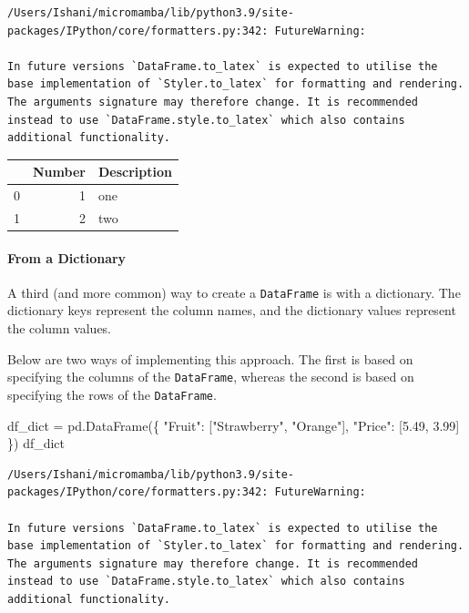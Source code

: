 \documentclass[
  letterpaper,
  DIV=11,
  numbers=noendperiod]{scrreprt}
\let\oldparagraph\paragraph
\renewcommand{\paragraph}[1]{\oldparagraph{#1}\mbox{}}
\newenvironment{Shaded}{\begin{snugshade}}{\end{snugshade}}
\newcommand{\FloatTok}[1]{\textcolor[rgb]{0.68,0.00,0.00}{#1}}
\newcommand{\NormalTok}[1]{\textcolor[rgb]{0.00,0.23,0.31}{#1}}
\newcommand{\OperatorTok}[1]{\textcolor[rgb]{0.37,0.37,0.37}{#1}}
\newcommand{\StringTok}[1]{\textcolor[rgb]{0.13,0.47,0.30}{#1}}
\begin{document}
\begin{verbatim}
/Users/Ishani/micromamba/lib/python3.9/site-packages/IPython/core/formatters.py:342: FutureWarning:

In future versions `DataFrame.to_latex` is expected to utilise the base implementation of `Styler.to_latex` for formatting and rendering. The arguments signature may therefore change. It is recommended instead to use `DataFrame.style.to_latex` which also contains additional functionality.
\end{verbatim}

\begin{tabular}{lrl}
\toprule
{} &  Number & Description \\
\midrule
0 &       1 &         one \\
1 &       2 &         two \\
\bottomrule
\end{tabular}

\hypertarget{from-a-dictionary}{%
\paragraph{From a Dictionary}\label{from-a-dictionary}}

A third (and more common) way to create a \texttt{DataFrame} is with a
dictionary. The dictionary keys represent the column names, and the
dictionary values represent the column values.

Below are two ways of implementing this approach. The first is based on
specifying the columns of the \texttt{DataFrame}, whereas the second is
based on specifying the rows of the \texttt{DataFrame}.

\begin{Shaded}
\begin{Highlighting}[]
\NormalTok{df\_dict }\OperatorTok{=}\NormalTok{ pd.DataFrame(\{}
    \StringTok{"Fruit"}\NormalTok{: [}\StringTok{"Strawberry"}\NormalTok{, }\StringTok{"Orange"}\NormalTok{], }
    \StringTok{"Price"}\NormalTok{: [}\FloatTok{5.49}\NormalTok{, }\FloatTok{3.99}\NormalTok{]}
\NormalTok{\})}
\NormalTok{df\_dict}
\end{Highlighting}
\end{Shaded}

\begin{verbatim}
/Users/Ishani/micromamba/lib/python3.9/site-packages/IPython/core/formatters.py:342: FutureWarning:

In future versions `DataFrame.to_latex` is expected to utilise the base implementation of `Styler.to_latex` for formatting and rendering. The arguments signature may therefore change. It is recommended instead to use `DataFrame.style.to_latex` which also contains additional functionality.
\end{verbatim}
\end{document}
